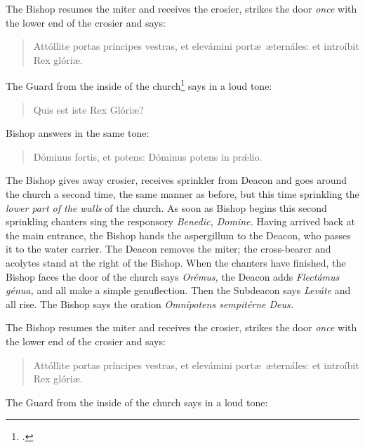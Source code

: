 \documentclass[letterpaper]{report}
\begin{document}
{    \rubric The Bishop resumes the miter and receives the crosier, strikes the
    door \textit{once} with the lower end of the crosier and says:

    \begin{quote}
        Attóllite portas príncipes vestras, et elevámini port\ae\ \ae ternáles: et
        introíbit Rex glóri\ae.
    \end{quote}

    The Guard from the inside of the church\footcite[The door may be slightly
    open, so that the bishop and the deacon of the church can hear each
    other.][note 1, p. 46.]{consecranda} says in a loud tone:

    \begin{quote}
       Quis est iste Rex Glóri\ae? 
    \end{quote}

    Bishop answers in the same tone:

    \begin{quote}
        Dóminus fortis, et potens: Dóminus potens in pr\'\ae lio.
    \end{quote}

    \rubric The Bishop gives away crosier, receives sprinkler from Deacon and
    goes around the church a second time, the same manner as before, but this
    time sprinkling the \textit{lower part of the walls} of the church. As soon
    as Bishop begins this second sprinkling chanters sing the responsory
    \textit{Benedic, Domine.} Having arrived back at the main entrance, the
    Bishop hands the aspergillum to the Deacon, who passes it to the water
    carrier. The Deacon removes the miter; the cross-bearer and acolytes stand
    at the right of the Bishop. When the chanters have finished, the Bishop
    faces the door of the church says \textit{Orémus,} the Deacon adds
    \textit{Flectámus génua,} and all make a simple genuflection. Then the
    Subdeacon says \textit{Leváte} and all rise. The Bishop says the oration
    \textit{Omnípotens sempitérne Deus.}

    \rubric The Bishop resumes the miter and receives the crosier, strikes the
    door \textit{once} with the lower end of the crosier and says:

    \begin{quote}
        Attóllite portas príncipes vestras, et elevámini port\ae\ \ae ternáles:
        et introíbit Rex glóri\ae.
    \end{quote}

    The Guard from the inside of the church says in a loud tone:

}
\end{document}
